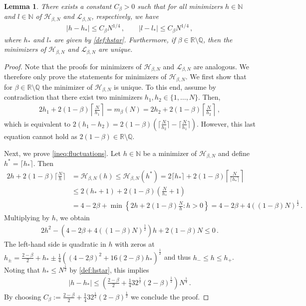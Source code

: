 \documentclass[reqno]{amsart}
\theoremstyle{plain}
\newtheorem{lemma}[theorem]{Lemma}
\theoremstyle{definition}
\numberwithin{equation}{section}
\newcommand{\N}{\mathbb{N}}
\begin{document}
\begin{lemma} \label{lem:quadratic}  
There exists a constant $C_\beta>0$ such that for all minimizers  $h \in \mathbb{N}$ and  $l \in \mathbb{N}$  of $\mathcal{H}_{\beta,N}$ and  $\mathcal{L}_{\beta,N}$, respectively,  we have
\begin{align}\label{ineq:fluctuations}
|h-h_*| \leq C_\beta N^{1/4}\,, \quad \quad  |l-l_*|\leq C_\beta N^{1/4} \,,
\end{align}
where $h_*$ and $l_*$ are given by \eqref{def:hstar}. Furthermore, if $\beta \in \mathbb{R} \setminus \mathbb{Q}$, then the minimizers of $\mathcal{H}_{\beta,N}$ and $\mathcal{L}_{\beta,N}$ are unique.
\end{lemma}

\begin{proof} 
Note that the proofs   for minimizers of  $\mathcal{H}_{\beta,N}$ and  $\mathcal{L}_{\beta,N}$ are analogous. We therefore only prove the statements for minimizers of  $\mathcal{H}_{\beta,N}$.  We first show that for $\beta \in \mathbb{R} \setminus \mathbb{Q}$ the minimizer of $\mathcal{H}_{\beta,N}$ is unique. To this end, assume by contradiction that there exist two minimizers $h_1,h_2 \in \{1,\ldots,N\}$. Then,
\begin{align*}
2h_1 +  2(1-\beta)\left\lceil \frac{N}{h_1} \right\rceil = m_\beta(N) = 2h_2 + 2(1-\beta) \left\lceil \frac{N}{h_2} \right\rceil\,,
\end{align*}
which is equivalent to $2(h_1-h_2) =  2(1-\beta) (\lceil \frac{N}{h_2}
\rceil -  \lceil \frac{N}{h_1}  \rceil)$.  However, this last
equation cannot hold  as $ 2(1-\beta)  \in \mathbb{R}\setminus \mathbb{Q}$.

Next, we prove \eqref{ineq:fluctuations}. Let $h \in \N$ be a minimizer of $\mathcal{H}_{\beta,N}$ and define $h^* = \lceil h_*\rceil$. Then
\begin{align*}
2h + 2(1-\beta) \Big\lceil \frac{N}{h} \Big\rceil  &=\mathcal{H}_{\beta,N}(h) \leq \mathcal{H}_{\beta,N}(h^*) = 2 \lceil h_*\rceil + 2(1-\beta) \left\lceil \frac{N}{\lceil h_*\rceil} \right\rceil \\&\leq 2(h_*+1) + 2(1-\beta) \left(\frac{N}{ h_*}+1\right) \\&= 4-2\beta +\min\left\{2h + 2(1-\beta)\frac{N}{h} \colon h>0 \right\} =4-2\beta + 4\left((1-\beta)  N\right)^{\frac{1}{2}}\,.
\end{align*}
Multiplying  by  $h$, we obtain
\begin{align*}
2h^2 -\left(4-2\beta + 4\left((1-\beta)  N\right)^{\frac{1}{2}}\right)h + 2(1-\beta) N \leq 0\,.
\end{align*}
  The left-hand side  is quadratic   in $h$ with
 zeros  at   $h_\pm = \frac{2-\beta}{2} +h_* \pm
 \frac{1}{4}\left((4-2\beta)^2 +16(2-\beta)h_*\right)^\frac{1}{2}$ and
 thus $h_- \leq h \leq h_+$.   Noting that  $h_* \leq N^{\frac{1}{2}}$  by \eqref{def:hstar},  this implies
\begin{align*}
|h-h_*| \leq \left(\frac{2-\beta}{2} +\frac{1}{4}32^\frac{1}{2}(2-\beta)^\frac{1}{2}\right)N^\frac{1}{4}\,.
\end{align*} 
By choosing  $C_\beta := \frac{2-\beta}{2} +\frac{1}{4}32^\frac{1}{2}(2-\beta)^\frac{1}{2} $    we conclude the proof.
\end{proof}
\end{document}
